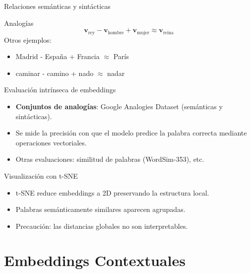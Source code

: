 \documentclass[aspectratio=169, 10pt, xcolor=table]{beamer}
\begin{document}
\begin{frame}{Relaciones semánticas y sintácticas}
    \begin{block}{Analogías}
        \[
        \mathbf{v}_{\text{rey}} - \mathbf{v}_{\text{hombre}} + \mathbf{v}_{\text{mujer}} \approx \mathbf{v}_{\text{reina}}
        \]
        Otros ejemplos:
        \begin{itemize}
            \item Madrid - España + Francia $\approx$ París
            \item caminar - camino + nado $\approx$ nadar
        \end{itemize}
    \end{block}
\end{frame}

\begin{frame}{Evaluación intrínseca de embeddings}
    \begin{itemize}
        \item \textbf{Conjuntos de analogías}: Google Analogies Dataset (semánticas y sintácticas).
        \item Se mide la precisión con que el modelo predice la palabra correcta mediante operaciones vectoriales.
        \item Otras evaluaciones: similitud de palabras (WordSim-353), etc.
    \end{itemize}
\end{frame}

\begin{frame}{Visualización con t-SNE}
    \begin{itemize}
        \item t-SNE reduce embeddings a 2D preservando la estructura local.
        \item Palabras semánticamente similares aparecen agrupadas.
        \item Precaución: las distancias globales no son interpretables.
    \end{itemize}
\end{frame}

\section{Embeddings Contextuales}
\end{document}
